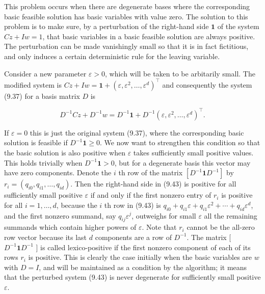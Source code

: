 \documentclass[12pt]{article}
\begin{document}
This problem occurs when there are degenerate bases where the corresponding basic feasible solution has basic variables with value zero. The solution to this problem is to make sure, by a perturbation of the right-hand side $\mathbf{1}$ of the system $C z+I w=1$, that basic variables in a basic feasible solution are always positive. The perturbation can be made vanishingly small so that it is in fact fictitious, and only induces a certain deterministic rule for the leaving variable.

Consider a new parameter $\varepsilon>0$, which will be taken to be arbitarily small. The modified system is $C z+I w=\mathbf{1}+\left(\varepsilon, \varepsilon^{2}, \ldots, \varepsilon^{d}\right)^{\top}$ and consequently the system (9.37) for a basis matrix $D$ is


\begin{equation*}
D^{-1} C z+D^{-1} w=D^{-1} \mathbf{1}+D^{-1}\left(\varepsilon, \varepsilon^{2}, \ldots, \varepsilon^{d}\right)^{\top} . \tag{9.43}
\end{equation*}


If $\varepsilon=0$ this is just the original system (9.37), where the corresponding basic solution is feasible if $D^{-1} \mathbf{1} \geq 0$. We now want to strengthen this condition so that the basic solution is also positive when $\varepsilon$ takes sufficiently small positive values. This holds trivially when $D^{-1} \mathbf{1}>0$, but for a degenerate basis this vector may have zero components. Denote the $i$ th row of the matrix $\left[D^{-1} \mathbf{1} D^{-1}\right]$ by $r_{i}=\left(q_{i 0}, q_{i 1}, \ldots, q_{i d}\right)$. Then the right-hand side in (9.43) is positive for all sufficiently small positive $\varepsilon$ if and only if the first nonzero entry of $r_{i}$ is positive for all $i=1, \ldots, d$, because the $i$ th row in (9.43) is $q_{i 0}+q_{i 1} \varepsilon+q_{i 1} \varepsilon^{2}+\cdots+q_{i d} \varepsilon^{d}$, and the first nonzero summand, say $q_{i j} \varepsilon^{j}$, outweighs for small $\varepsilon$ all the remaining summands which contain higher powers of $\varepsilon$. Note that $r_{i}$ cannot be the all-zero row vector because its last $d$ components are a row of $D^{-1}$. The matrix [ $D^{-1} \mathbf{1} D^{-1}$ ] is called lexico-positive if the first nonzero component of each of its rows $r_{i}$ is positive. This is clearly the case initially when the basic variables are $w$ with $D=I$, and will be maintained as a condition by the algorithm; it means that the perturbed system (9.43) is never degenerate for sufficiently small positive $\varepsilon$.
\end{document}
